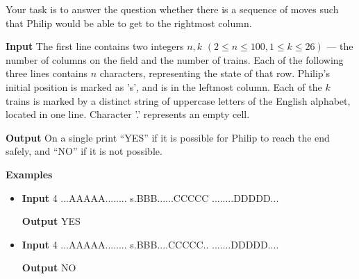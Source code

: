 \normalfont\documentclass[letterpaper,11pt]{article}
\begin{document}
Your task is to answer the question whether there is a sequence of moves such that Philip would be able to get to the rightmost column.

\textbf{Input} \newline
The first line contains two integers $n, k$ $(2 \leq  n  \leq 100, 1 \leq k \leq 26)$ — the number of columns on the field and the number of trains. Each of the following three lines contains $n$ characters, representing the state of that row. Philip's initial position is marked as 's', and is in the leftmost column. Each of the $k$ trains is marked by a distinct string of uppercase letters of the English alphabet, located in one line. Character '.' represents an empty cell.


\textbf{Output} \newline
On a single print ``YES'' if it is possible for Philip to reach the end safely, and ``NO'' if it is not possible.

\textbf{Examples}
\begin{itemize}
\item \textbf{Input}  4 \newline
...AAAAA........ \newline
s.BBB......CCCCC \newline
........DDDDD...

\textbf{Output} \newline
YES

\item \textbf{Input}  4 \newline
...AAAAA........ \newline
s.BBB....CCCCC.. \newline
.......DDDDD....

\textbf{Output} \newline
NO

\end{itemize}
\end{document}
